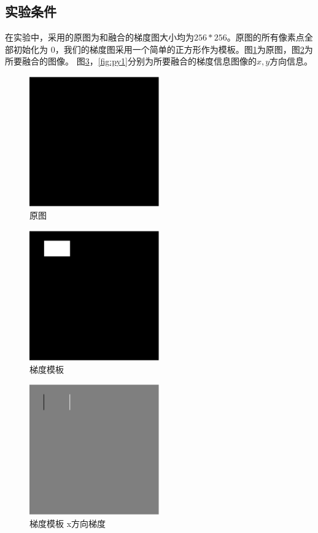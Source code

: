 \subsection{实验条件}
在实验中，采用的原图为和融合的梯度图大小均为$256*256$。原图的所有像素点全部初始化为
$0$，我们的梯度图采用一个简单的正方形作为模板。图\ref{fig:I1}为原图，图\ref{fig:p1}为所要融合的图像。
图\ref{fig:px1}，\ref{fig:py1}分别为所要融合的梯度信息图像的$x,y$方向信息。
\begin{figure}[h!]
\center
\includegraphics[width=0.5\textwidth]{figure/gradtest/I1}
\caption{原图}\label{fig:I1}
\end{figure}
\begin{figure}[h!]
\center
\includegraphics[width=0.5\textwidth]{figure/gradtest/p1}
\caption{梯度模板}\label{fig:p1}
\end{figure}
\begin{figure}[h!]
\center
\includegraphics[width=0.5\textwidth]{figure/gradtest/px1}
\caption{梯度模板 x方向梯度}\label{fig:px1}
\end{figure}
